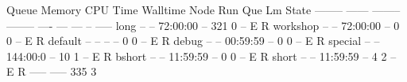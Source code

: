 \begin{prompt}
Queue    Memory CPU Time Walltime Node  Run Que Lm  State
-------- ------ -------- -------- ----  --- --- --  -----
long       --      --    72:00:00   --  321   0 --   E R
workshop   --      --    72:00:00   --    0   0 --   E R
default    --      --       --      --    0   0 --   E R
debug      --      --    00:59:59   --    0   0 --   E R
special    --      --    144:00:0   --   10   1 --   E R
bshort     --      --    11:59:59   --    0   0 --   E R
short      --      --    11:59:59   --    4   2 --   E R
                                       ----- -----
                                         335     3
\end{prompt}
